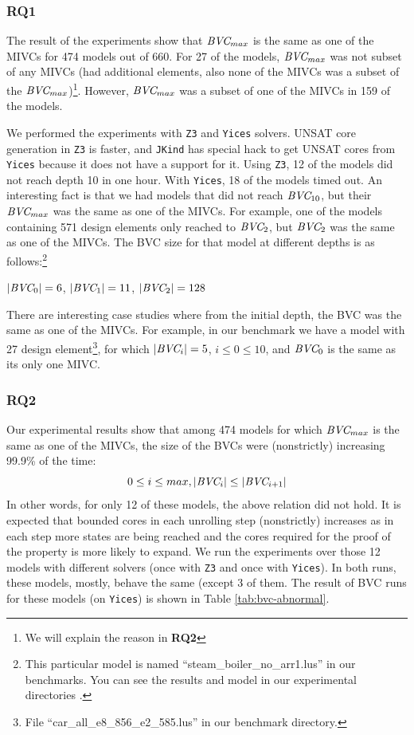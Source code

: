 \vspace{0.1in}
\subsubsection{RQ1}
The result of the experiments show that $\textit{BVC} _{max}$ is the same as one of the MIVCs for 474 models out of 660. For 27 of the models, $\textit{BVC} _{max}$ was not subset of any MIVCs (had additional elements, also none of the MIVCs was a subset of the $\textit{BVC} _{max}$)\footnote{We will explain the reason in \textbf{RQ2}}. However, $\textit{BVC} _{max}$ was a subset of one of the MIVCs in 159 of the models.

We performed the experiments with \texttt{Z3} and \texttt{Yices} solvers. UNSAT core generation in \texttt{Z3} is faster, and \texttt{JKind} has special hack to get UNSAT cores from \texttt{Yices} because it does not have a support for it. Using \texttt{Z3}, 12 of the models did not reach depth 10 in one hour. With \texttt{Yices}, 18 of the models timed out. An interesting fact is that we had models that did not reach $\textit{BVC} _{10}$, but their $\textit{BVC} _{max}$ was the same as one of the MIVCs. For example, one of the models containing 571 design elements only reached to $\textit{BVC} _{2}$, but $\textit{BVC} _{2}$ was the same as one of the MIVCs.
The BVC size for that model at different depths is as follows:\footnote{This particular model is named ``steam\_boiler\_no\_arr1.lus'' in our benchmarks. You can see the results and model in our experimental directories \cite{expr}.}

$|\textit{BVC} _{0}| = 6$, $|\textit{BVC} _{1}| = 11$, $|\textit{BVC} _{2}| = 128$

There are interesting case studies where from the initial depth, the BVC was the same as one of the MIVCs. For example, in our benchmark we have a model with 27 design element\footnote{File ``car\_all\_e8\_856\_e2\_585.lus'' in our benchmark directory.}, for which $|\textit{BVC} _{i}| = 5$, $i \leq 0 \le 10$, and $\textit{BVC} _{0}$ is the same as its only one MIVC.

\vspace{0.1in}
\subsubsection{RQ2}
Our experimental results show that among 474 models for which $\textit{BVC} _{max}$ is the same as one of the MIVCs, the size of the BVCs were (nonstrictly) increasing 99.9\% of the time:
      $$ 0 \leq i \le max, |\textit{BVC} _{i}| \leq |\textit{BVC} _{i+1}|$$
      In other words, for only 12 of these models, the above relation did not hold.
      It is expected that bounded cores in each unrolling step (nonstrictly) increases as in each step more states are being reached and the cores required for the proof of the property is more likely to expand.
      We run the experiments over those 12 models with different solvers (once with \texttt{Z3} and once with \texttt{Yices}). In both runs, these models, mostly, behave the same (except 3 of them. The result of BVC runs for these models (on \texttt{Yices}) is shown in Table \ref{tab:bvc-abnormal}.

